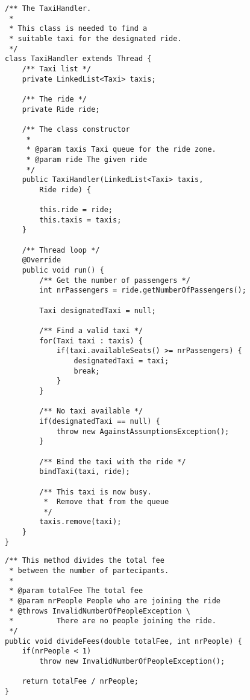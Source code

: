 \begin{lstlisting}[frame=single]
/** The TaxiHandler.
 *
 * This class is needed to find a 
 * suitable taxi for the designated ride.
 */
class TaxiHandler extends Thread {
    /** Taxi list */
    private LinkedList<Taxi> taxis;

    /** The ride */
    private Ride ride;

    /** The class constructor 
     *
     * @param taxis Taxi queue for the ride zone.
     * @param ride The given ride
     */
    public TaxiHandler(LinkedList<Taxi> taxis, 
        Ride ride) {

        this.ride = ride;
        this.taxis = taxis;
    }

    /** Thread loop */
    @Override
    public void run() {
        /** Get the number of passengers */
        int nrPassengers = ride.getNumberOfPassengers();

        Taxi designatedTaxi = null;

        /** Find a valid taxi */
        for(Taxi taxi : taxis) {
            if(taxi.availableSeats() >= nrPassengers) {
                designatedTaxi = taxi;
                break;
            }
        }

        /** No taxi available */
        if(designatedTaxi == null) {
            throw new AgainstAssumptionsException();
        }

        /** Bind the taxi with the ride */
        bindTaxi(taxi, ride);
        
        /** This taxi is now busy. 
         *  Remove that from the queue 
         */
        taxis.remove(taxi);
    }
}
\end{lstlisting}

\begin{lstlisting}[frame=single]
/** This method divides the total fee 
 * between the number of partecipants.
 * 
 * @param totalFee The total fee
 * @param nrPeople People who are joining the ride
 * @throws InvalidNumberOfPeopleException \
 *          There are no people joining the ride.
 */
public void divideFees(double totalFee, int nrPeople) {
    if(nrPeople < 1)
        throw new InvalidNumberOfPeopleException();

    return totalFee / nrPeople;
}
\end{lstlisting}

